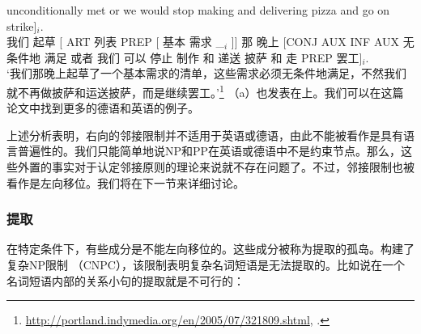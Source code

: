   unconditionally met or we would stop making and 
delivering pizza and go on strike]$_i$.\\
我们 起草 [ ART 列表 PREP [ 基本 需求 \_$_i$ ]] 那 晚上 [CONJ AUX INF AUX
  无条件地 满足 或者 我们 可以 停止 制作 和 
递送 披萨 和 走 PREP 罢工]$_i$.\\
\glt `我们那晚上起草了一个基本需求的清单，这些需求必须无条件地满足，不然我们就不再做披萨和运送披萨，而是继续罢工。'\footnote{
\url{http://portland.indymedia.org/en/2005/07/321809.shtml}, .
}
\zl
（a）也发表在上。我们可以在这篇论文中找到更多的德语和英语的例子。

\addlines
上述分析表明，右向的邻接限制并不适用于英语或德语，由此不能被看作是具有语言普遍性的。我们只能简单地说NP和PP在英语或德语中不是约束节点。那么，这些外置的事实对于认定邻接原则的理论来说就不存在问题了。不过，邻接限制也被看作是左向移位。我们将在下一节来详细讨论。 

\subsubsection{提取}
\label{Abschnitt-Subjazenz-Extraktion}

在特定条件下，有些成分是不能左向移位的\citep{Ross67}。这些成分被称为提取的孤岛。\citet[Section~4.1]{Ross67}构建了复杂NP限制 （CNPC），该限制表明复杂名词短语是无法提取的。比如说在一个名词短语内部的关系小句的提取就是不可行的： 


